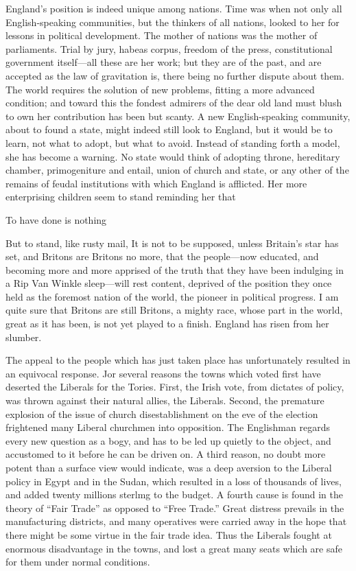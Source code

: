 \documentclass[11pt,openany]{book}
\begin{document}
England's position is indeed unique among nations. Time was when not only all English-speaking communities, but the thinkers of all nations, looked to her for lessons in political development. The mother of nations was the mother of parliaments. Trial by jury, habeas corpus, freedom of the press, constitutional government itself---all these are her work; but they are of the past, and are accepted as the law of gravitation is, there being no further dispute about them. The world requires the solution of new problems, fitting a more advanced condition; and toward this the fondest admirers of the dear old land must blush to own her contribution has been but scanty. A new English-speaking community, about to found a state, might indeed still look to England, but it would be to learn, not what to adopt, but what to avoid. Instead of standing forth a model, she has become a warning. No state would think of adopting throne, hereditary chamber, primogeniture and entail, union of church and state, or any other of the remains of feudal institutions with which England is afflicted. Her more enterprising children seem to stand reminding her that

To have done is nothing

But to stand, like rusty mail, It is not to be supposed, unless Britain's star has set, and Britons are Britons no more, that the people---now educated, and becoming more and more apprised of the truth that they have been indulging in a Rip Van Winkle sleep---will rest content, deprived of the position they once held as the foremost nation of the world, the pioneer in political progress. I am quite sure that Britons are still Britons, a mighty race, whose part in the world, great as it has been, is not yet played to a finish. England has risen from her slumber.

The appeal to the people which has just taken place has unfortunately resulted in an equivocal response. Jor several reasons the towns which voted first have deserted the Liberals for the Tories. First, the Irish vote, from dictates of policy, was thrown against their natural allies, the Liberals. Second, the premature explosion of the issue of church disestablishment on the eve of the election frightened many Liberal churchmen into opposition. The Englishman regards every new question as a bogy, and has to be led up quietly to the object, and accustomed to it before he can be driven on. A third reason, no doubt more potent than a surface view would indicate, was a deep aversion to the Liberal policy in Egypt and in the Sudan, which resulted in a loss of thousands of lives, and added twenty millions sterlmg to the budget. A fourth cause is found in the theory of ``Fair Trade'' as opposed to ``Free Trade.'' Great distress prevails in the manufacturing districts, and many operatives were carried away in the hope that there might be some virtue in the fair trade idea. Thus the Liberals fought at enormous disadvantage in the towns, and lost a great many seats which are safe for them under normal conditions.
\end{document}
